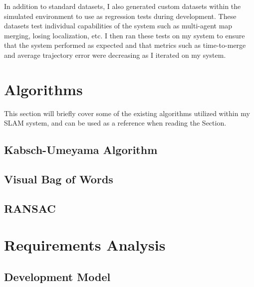 In addition to standard datasets, I also generated custom datasets within the simulated environment to use as regression tests during development. These datasets test individual capabilities of the system such as multi-agent map merging, losing localization, etc. I then ran these tests on my system to ensure that the system performed as expected and that metrics such as time-to-merge and average trajectory error were decreasing as I iterated on my system.

\section{Algorithms}
\label{sec:algorithms}
This section will briefly cover some of the existing algorithms utilized within my SLAM system, and can be used as a reference when reading the  Section.

\subsection{Kabsch-Umeyama Algorithm}
\label{sec:kabsch-umeyama-algorithm}

\subsection{Visual Bag of Words}
\label{sec:visual-bag-of-words}

\subsection{RANSAC}
\label{sec:ransac}

\section{Requirements Analysis}
\label{sec:requirements-analysis}

\subsection{Development Model}
\label{sec:development-model}

